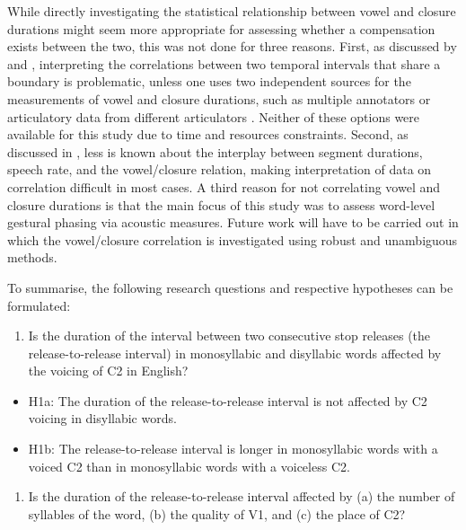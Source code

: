 \documentclass[12pt,a4paper,]{article}
\providecommand{\tightlist}{%
  \setlength{\itemsep}{0pt}\setlength{\parskip}{0pt}}
\begin{document}
While directly investigating the statistical relationship between vowel
and closure durations might seem more appropriate for assessing whether
a compensation exists between the two, this was not done for three
reasons. First, as discussed by \citet{ohala1976} and \citet{begus2017},
interpreting the correlations between two temporal intervals that share
a boundary is problematic, unless one uses two independent sources for
the measurements of vowel and closure durations, such as multiple
annotators \citep{begus2017} or articulatory data from different
articulators \citep{de-jong1991}. Neither of these options were
available for this study due to time and resources constraints. Second,
as discussed in \citet{coretta2019k}, less is known about the interplay
between segment durations, speech rate, and the vowel/closure relation,
making interpretation of data on correlation difficult in most cases. A
third reason for not correlating vowel and closure durations is that the
main focus of this study was to assess word-level gestural phasing via
acoustic measures. Future work will have to be carried out in which the
vowel/closure correlation is investigated using robust and unambiguous
methods.

To summarise, the following research questions and respective hypotheses
can be formulated:

\begin{enumerate}
\def\labelenumi{\arabic{enumi}.}
\tightlist
\item
  Is the duration of the interval between two consecutive stop releases
  (the release-to-release interval) in monosyllabic and disyllabic words
  affected by the voicing of C2 in English?
\end{enumerate}

\begin{itemize}
\tightlist
\item
  H1a: The duration of the release-to-release interval is not affected
  by C2 voicing in disyllabic words.
\item
  H1b: The release-to-release interval is longer in monosyllabic words
  with a voiced C2 than in monosyllabic words with a voiceless C2.
\end{itemize}

\begin{enumerate}
\def\labelenumi{\arabic{enumi}.}
\setcounter{enumi}{1}
\tightlist
\item
  Is the duration of the release-to-release interval affected by (a) the
  number of syllables of the word, (b) the quality of V1, and (c) the
  place of C2?
\end{enumerate}
\end{document}
